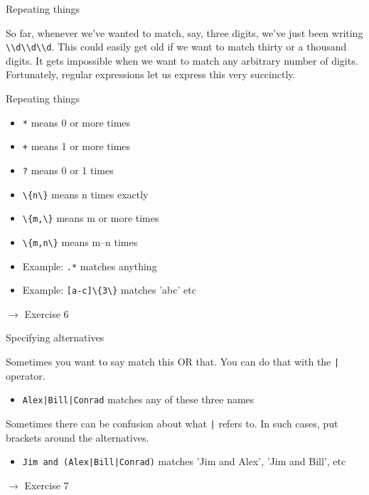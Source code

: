 \documentclass{beamer}
\begin{document}
\begin{frame}{Repeating things}

So far, whenever we've wanted to match, say, three digits, we've just been writing
\lstinline$\\d\\d\\d$. This could easily get old if we want to match thirty or a thousand digits.
It gets impossible when we want to match any arbitrary number of digits.
Fortunately, regular expressions let us express this very succinctly.

\end{frame}

\begin{frame}{Repeating things}

\begin{itemize}
 \item \lstinline$*$ means 0 or more times
 \item \lstinline$+$ means 1 or more times
 \item \lstinline$?$ means 0 or 1 times
 \item \lstinline$\{n\}$ means n times exactly
 \item \lstinline$\{m,\}$ means m or more times
 \item \lstinline$\{m,n\}$ means m--n times
 \item Example: \lstinline$.*$ matches anything
 \item Example: \lstinline$[a-c]\{3\}$ matches 'abc' etc
\end{itemize}

\bigskip
$\rightarrow$ Exercise 6

\end{frame}

\begin{frame}{Specifying alternatives}

Sometimes you want to say match this OR that.
You can do that with the \lstinline$|$ operator.

\begin{itemize}
  \item \lstinline$Alex|Bill|Conrad$ matches any of these three names
\end{itemize}

Sometimes there can be confusion about what \lstinline$|$ refers to.
In such cases, put brackets around the alternatives.

\begin{itemize}
  \item \lstinline$Jim and (Alex|Bill|Conrad)$ matches 'Jim and Alex', 'Jim and Bill', etc
\end{itemize}

\bigskip
$\rightarrow$ Exercise 7

\end{frame}
\end{document}
